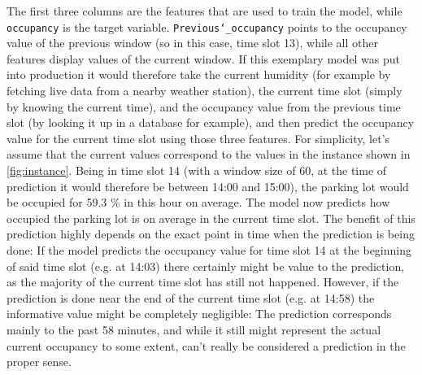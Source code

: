 The first three columns are the features that are used to train the model, while \texttt{occupancy} is the target variable. \texttt{Previous\char`_occupancy} points to the occupancy value of the previous window (so in this case, time slot 13), while all other features display values of the current window. If this exemplary model was put into production it would therefore take the current humidity (for example by fetching live data from a nearby weather station), the current time slot (simply by knowing the current time), and the occupancy value from the previous time slot (by looking it up in a database for example), and then predict the occupancy value for the current time slot using those three features. For simplicity, let’s assume that the current values correspond to the values in the instance shown in \autoref{fig:instance}. Being in time slot 14 (with a window size of 60, at the time of prediction it would therefore be between 14:00 and 15:00), the parking lot would be occupied for 59.3 \% in this hour on average. The model now predicts how occupied the parking lot is on average in the current time slot. The benefit of this prediction highly depends on the exact point in time when the prediction is being done: If the model predicts the occupancy value for time slot 14 at the beginning of said time slot (e.g. at 14:03) there certainly might be value to the prediction, as the majority of the current time slot has still not happened. However, if the prediction is done near the end of the current time slot (e.g. at 14:58) the informative value might be completely negligible: The prediction corresponds mainly to the past 58 minutes, and while it still might represent the actual current occupancy to some extent, can’t really be considered a prediction in the proper sense. 

